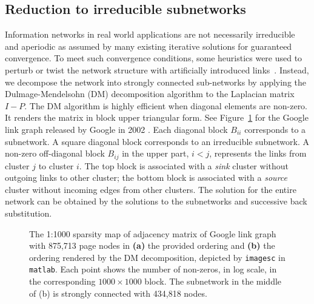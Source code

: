 \documentclass[conference]{IEEEtran}
\begin{document}
\subsection{Reduction to irreducible subnetworks}
\label{subsec:model-reduction}
%


% 
Information networks in real world applications are not necessarily
irreducible and aperiodic as assumed by many existing iterative
solutions for guaranteed convergence. To meet such convergence
conditions, some heuristics were used to perturb or twist the network
structure with artificially introduced links~\cite{lee2003fast,
langville2006reordering}.
%
Instead, we decompose the network into strongly connected sub-networks
by applying the Dulmage-Mendelsohn (DM) decomposition algorithm
\cite{dulmage1958coverings} to the Laplacian matrix $I-P$. The DM
algorithm is highly efficient when diagonal elements are non-zero. 
%
It renders the matrix in block upper triangular form. See
Figure~\ref{fig:dm} for the Google link graph released by Google in 2002 \cite{google-net}.
%
Each diagonal block $B_{ii}$ corresponds to a subnetwork. A
square diagonal block corresponds to an irreducible
subnetwork. A non-zero off-diagonal block $B_{ij}$ in the upper part,
$i<j$, represents the links from cluster $j$ to cluster $i$. The top
block is associated with a {\em sink} cluster without outgoing links to
other cluster; the bottom block is associated with a {\em source}
cluster without incoming edges from other clusters. The solution for the
entire network can be obtained by the solutions to the subnetworks and
successive back substitution.
%

\begin{figure}[!htb]
  \centering
  \caption{%
   \footnotesize The 1:1000 sparsity map of adjacency matrix of Google link graph \cite{google-net} with 875,713
    page nodes in {\bf (a)} the provided ordering and {\bf (b)} the ordering rendered by the DM decomposition, depicted by {\tt imagesc} in {\tt matlab}. Each point shows the number of non-zeros, in log scale, in the corresponding $1000 \times 1000$ block. The subnetwork in the middle of (b) is strongly connected with 434,818 nodes.}
  \label{fig:dm}
\end{figure}
\end{document}
